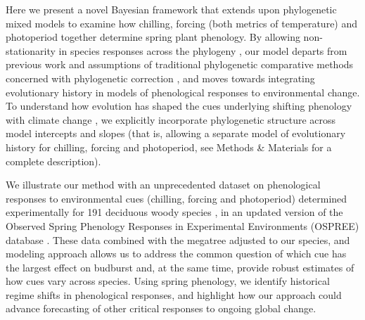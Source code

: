 \documentclass[11pt]{article}
\begin{document}
Here we present a novel Bayesian framework that extends upon phylogenetic mixed models \citep{housworth2004phylogenetic} to examine how chilling, forcing (both metrics of temperature) and photoperiod together determine spring plant phenology. By allowing non-stationarity in species responses across the phylogeny \citep{davies2019phylogenetically}, our model departs from previous work and assumptions of traditional phylogenetic comparative methods concerned with phylogenetic correction \citep[e.g.,][]{freckleton2002phylogenetic}, and moves towards integrating evolutionary history in models of phenological responses to environmental change. To understand how evolution has shaped the cues underlying shifting phenology with climate change \citep{uyeda2017evolution}, we explicitly incorporate phylogenetic structure across model intercepts and slopes (that is, allowing a separate model of evolutionary history for chilling, forcing and photoperiod, see Methods \& Materials for a complete description). 

We illustrate our method with an unprecedented dataset on phenological responses to environmental cues (chilling, forcing and photoperiod) determined experimentally for 191 deciduous woody species \cite[by far the most studied group of species in phenology experiments, see][]{ettinger2020}, in an updated version of the Observed Spring Phenology Responses in Experimental Environments (OSPREE) database \citep{wolkovich2019}. These data combined with the \citet{smith2018constructing} megatree adjusted to our species, and modeling approach allows us to address the common question of which cue has the largest effect on budburst and, at the same time, provide robust estimates of how cues vary across species. Using spring phenology, we identify historical regime shifts \citep{uyeda2017evolution} in phenological responses, and highlight how our approach could advance forecasting of other critical responses to ongoing global change.



\end{document}
